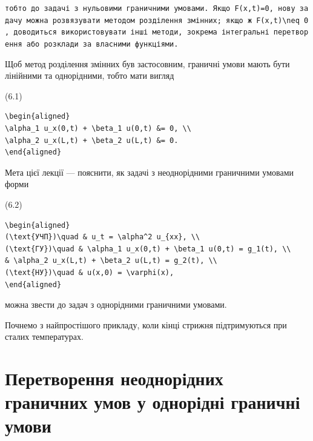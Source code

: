 \documentclass[
  ukrainian,
]{article}
\begin{document}
\texttt{тобто\ до\ задачі\ з\ нульовими\ граничними\ умовами.\ Якщо\ \textquotesingle{}F(x,t)=0\textquotesingle{},\ нову\ задачу\ можна\ розв\textquotesingle{}язувати\ методом\ розділення\ змінних;\ якщо\ ж\ \textquotesingle{}F(x,t)\textbackslash{}neq\ 0\textquotesingle{},\ доводиться\ використовувати\ інші\ методи,\ зокрема\ інтегральні\ перетворення\ або\ розклади\ за\ власними\ функціями.}

Щоб метод розділення змінних був застосовним, граничні умови мають бути
лінійними та однорідними, тобто мати вигляд

(6.1)

\begin{verbatim}
\begin{aligned}
\alpha_1 u_x(0,t) + \beta_1 u(0,t) &= 0, \\
\alpha_2 u_x(L,t) + \beta_2 u(L,t) &= 0.
\end{aligned}
\end{verbatim}

Мета цієї лекції --- пояснити, як задачі з неоднорідними граничними
умовами форми

(6.2)

\begin{verbatim}
\begin{aligned}
(\text{УЧП})\quad & u_t = \alpha^2 u_{xx}, \\
(\text{ГУ})\quad & \alpha_1 u_x(0,t) + \beta_1 u(0,t) = g_1(t), \\
& \alpha_2 u_x(L,t) + \beta_2 u(L,t) = g_2(t), \\
(\text{НУ})\quad & u(x,0) = \varphi(x),
\end{aligned}
\end{verbatim}

можна звести до задач з однорідними граничними умовами.

Почнемо з найпростішого прикладу, коли кінці стрижня підтримуються при
сталих температурах.

\section{Перетворення неоднорідних граничних умов у однорідні граничні
умови}\label{ux43fux435ux440ux435ux442ux432ux43eux440ux435ux43dux43dux44f-ux43dux435ux43eux434ux43dux43eux440ux456ux434ux43dux438ux445-ux433ux440ux430ux43dux438ux447ux43dux438ux445-ux443ux43cux43eux432-ux443-ux43eux434ux43dux43eux440ux456ux434ux43dux456-ux433ux440ux430ux43dux438ux447ux43dux456-ux443ux43cux43eux432ux438}
\end{document}

